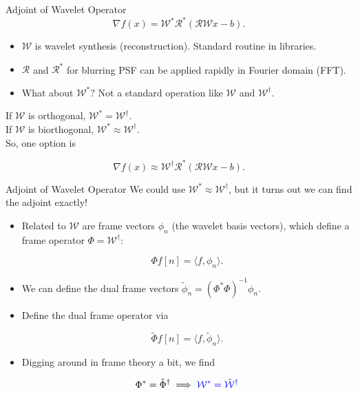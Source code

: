 \documentclass[xcolor=dvipsnames,t]{beamer} %
\begin{document}
\begin{frame}{Adjoint of Wavelet Operator}
   \[ \nabla f(x) = \mathcal{W}^\ast\mathcal{R}^\ast\left(\mathcal{RW}x-b\right). \] 
   
   \begin{itemize}
      \item $\mathcal{W}$ is wavelet synthesis (reconstruction).  Standard routine in libraries.
      \item $\mathcal{R}$ and $\mathcal{R}^\ast$ for blurring PSF can be applied rapidly in Fourier domain (FFT).
      \item What about $\mathcal{W}^\ast$?  Not a standard operation like $\mathcal{W}$ and $\mathcal{W}^\dagger$.
   \end{itemize}

   If $\mathcal{W}$ is orthogonal, $\mathcal{W}^\ast = \mathcal{W}^\dagger$.\\
   If $\mathcal{W}$ is biorthogonal, $\mathcal{W}^\ast \approx \mathcal{W}^\dagger$.\\
   So, one option is

   \[ \nabla f(x) \approx \mathcal{W}^\dagger\mathcal{R}^\ast\left(\mathcal{RW}x-b\right). \]
   
\end{frame}

\begin{frame}{Adjoint of Wavelet Operator}
   We could use $\mathcal{W}^\ast \approx \mathcal{W}^\dagger$, but it turns out we can find the adjoint exactly!\\
   
   \begin{itemize}
      \item Related to $\mathcal{W}$ are frame vectors $\phi_n$ (the wavelet basis vectors), which define a frame operator $\Phi=\mathcal{W}^\dagger$:

         \[ \Phi f[n] = \langle f, \phi_n\rangle. \] 
      \item We can define the dual frame vectors $\tilde{\phi}_n=\left(\Phi^\ast\Phi\right)^{-1}\phi_n$.
      \item Define the dual frame operator via

         \[ \tilde{\Phi}f[n] = \langle f, \tilde{\phi}_n\rangle. \] 

      \item Digging around in frame theory a bit, we find

         \[ \Phi^\ast = \tilde{\Phi}^\dagger \implies {\color{blue}\mathcal{W}^\ast = \tilde{\mathcal{W}}^\dagger}\] 
   \end{itemize}

\end{frame}
\end{document}
